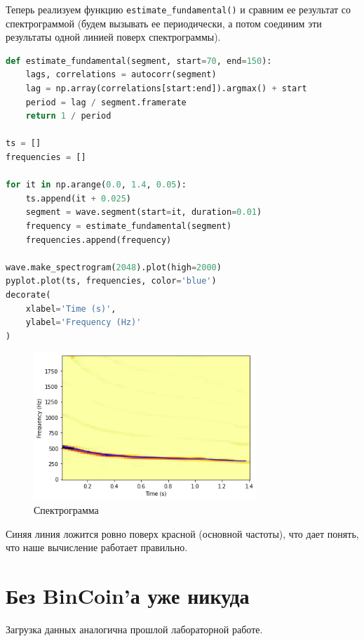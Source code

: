 \documentclass[a4paper,12pt]{report}
\begin{document}
    Теперь реализуем функцию \texttt{estimate\_fundamental()} и сравним ее результат со спектрограммой (будем вызывать ее периодически, а потом соединим эти результаты одной линией поверх спектрограммы).
    
\begin{lstlisting}[language=Python,caption=Сравниваем]
def estimate_fundamental(segment, start=70, end=150):
    lags, correlations = autocorr(segment)
    lag = np.array(correlations[start:end]).argmax() + start
    period = lag / segment.framerate
    return 1 / period

ts = []
frequencies = []

for it in np.arange(0.0, 1.4, 0.05):
    ts.append(it + 0.025)
    segment = wave.segment(start=it, duration=0.01)
    frequency = estimate_fundamental(segment)
    frequencies.append(frequency)

wave.make_spectrogram(2048).plot(high=2000)
pyplot.plot(ts, frequencies, color='blue')
decorate(
    xlabel='Time (s)',
    ylabel='Frequency (Hz)'
)
\end{lstlisting}

    \begin{figure}[H]
        \centering
        \includegraphics[width=0.75\textwidth]{images/ex2_comparison.png}
        \caption{Спектрограмма}
        \label{fig:ex2_comparison}
    \end{figure}
    
    Синяя линия ложится ровно поверх красной (основной частоты), что дает понять, что наше вычисление работает правильно.
    
    \chapter{Без BinCoin'а уже никуда}
    
    Загрузка данных аналогична прошлой лабораторной работе.
    
\end{document}
